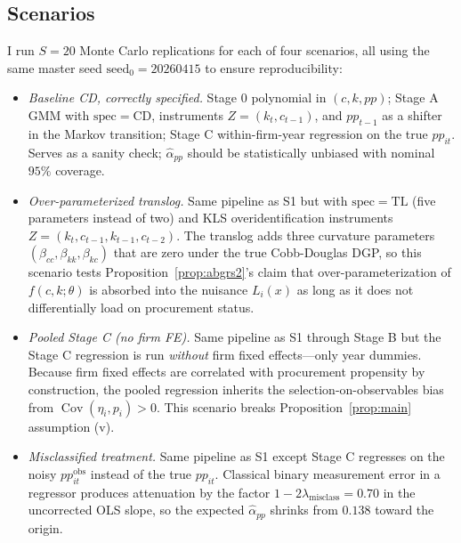 \documentclass[11pt]{article}
\DeclareMathOperator{\Cov}{Cov}
\begin{document}
\subsection{Scenarios}\label{sec:mc_scenarios}

I run $S = 20$ Monte Carlo replications for each of four scenarios, all using the same master seed $\text{seed}_0 = 20260415$ to ensure reproducibility:

\begin{itemize}
\item[\textbf{S1}] \emph{Baseline CD, correctly specified.} Stage 0 polynomial in $(c, k, pp)$; Stage A GMM with $\text{spec} = \mathrm{CD}$, instruments $Z = (k_t, c_{t-1})$, and $pp_{t-1}$ as a shifter in the Markov transition; Stage C within-firm-year regression on the true $pp_{it}$. Serves as a sanity check; $\hat\alpha_{pp}$ should be statistically unbiased with nominal $95\%$ coverage.

\item[\textbf{S2}] \emph{Over-parameterized translog.} Same pipeline as S1 but with $\text{spec} = \mathrm{TL}$ (five parameters instead of two) and KLS overidentification instruments $Z = (k_t, c_{t-1}, k_{t-1}, c_{t-2})$. The translog adds three curvature parameters $(\beta_{cc}, \beta_{kk}, \beta_{kc})$ that are zero under the true Cobb-Douglas DGP, so this scenario tests Proposition~\ref{prop:abgrs2}'s claim that over-parameterization of $f(c,k;\theta)$ is absorbed into the nuisance $L_i(x)$ as long as it does not differentially load on procurement status.

\item[\textbf{S3}] \emph{Pooled Stage C (no firm FE).} Same pipeline as S1 through Stage B but the Stage C regression is run \emph{without} firm fixed effects---only year dummies. Because firm fixed effects are correlated with procurement propensity by construction, the pooled regression inherits the selection-on-observables bias from $\Cov(\eta_i, p_i) > 0$. This scenario breaks Proposition~\ref{prop:main} assumption (v).

\item[\textbf{S4}] \emph{Misclassified treatment.} Same pipeline as S1 except Stage C regresses on the noisy $pp^{\text{obs}}_{it}$ instead of the true $pp_{it}$. Classical binary measurement error in a regressor produces attenuation by the factor $1 - 2\lambda_{\text{misclass}} = 0.70$ in the uncorrected OLS slope, so the expected $\hat\alpha_{pp}$ shrinks from $0.138$ toward the origin.
\end{itemize}
\end{document}
